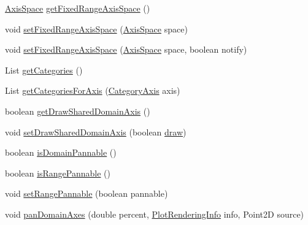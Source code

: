\begin{DoxyCompactItemize}
\item 
\mbox{\hyperlink{classorg_1_1jfree_1_1chart_1_1axis_1_1_axis_space}{Axis\+Space}} \mbox{\hyperlink{classorg_1_1jfree_1_1chart_1_1plot_1_1_category_plot_a436aced34ca58adf5d445e6a62f861c9}{get\+Fixed\+Range\+Axis\+Space}} ()
\item 
void \mbox{\hyperlink{classorg_1_1jfree_1_1chart_1_1plot_1_1_category_plot_a281491a8dbacd4f5a2e1cf156850d6a0}{set\+Fixed\+Range\+Axis\+Space}} (\mbox{\hyperlink{classorg_1_1jfree_1_1chart_1_1axis_1_1_axis_space}{Axis\+Space}} space)
\item 
void \mbox{\hyperlink{classorg_1_1jfree_1_1chart_1_1plot_1_1_category_plot_a2e0fb5c2ddc9f075eb43d0efff471044}{set\+Fixed\+Range\+Axis\+Space}} (\mbox{\hyperlink{classorg_1_1jfree_1_1chart_1_1axis_1_1_axis_space}{Axis\+Space}} space, boolean notify)
\item 
List \mbox{\hyperlink{classorg_1_1jfree_1_1chart_1_1plot_1_1_category_plot_aca7e5c323ac879cefd2816c7f3f3f994}{get\+Categories}} ()
\item 
List \mbox{\hyperlink{classorg_1_1jfree_1_1chart_1_1plot_1_1_category_plot_a879a45cd478b62daf45aa2d82a49546e}{get\+Categories\+For\+Axis}} (\mbox{\hyperlink{classorg_1_1jfree_1_1chart_1_1axis_1_1_category_axis}{Category\+Axis}} axis)
\item 
boolean \mbox{\hyperlink{classorg_1_1jfree_1_1chart_1_1plot_1_1_category_plot_a9e0c506ed8f06c4136707ed8bc7febf2}{get\+Draw\+Shared\+Domain\+Axis}} ()
\item 
void \mbox{\hyperlink{classorg_1_1jfree_1_1chart_1_1plot_1_1_category_plot_ac261da7da2048f2b53f78ef996dfc2c5}{set\+Draw\+Shared\+Domain\+Axis}} (boolean \mbox{\hyperlink{classorg_1_1jfree_1_1chart_1_1plot_1_1_category_plot_ac32fc9b28844db99ced138bd570596c3}{draw}})
\item 
boolean \mbox{\hyperlink{classorg_1_1jfree_1_1chart_1_1plot_1_1_category_plot_ac365d760808474f7b01fb0642a956f93}{is\+Domain\+Pannable}} ()
\item 
boolean \mbox{\hyperlink{classorg_1_1jfree_1_1chart_1_1plot_1_1_category_plot_ae919889b6b612a6f5df7f204a3356d19}{is\+Range\+Pannable}} ()
\item 
void \mbox{\hyperlink{classorg_1_1jfree_1_1chart_1_1plot_1_1_category_plot_ac8f35c81ce79745391ed6d160a1d8ddd}{set\+Range\+Pannable}} (boolean pannable)
\item 
void \mbox{\hyperlink{classorg_1_1jfree_1_1chart_1_1plot_1_1_category_plot_a62e996586fd48d02b2344940eae20f40}{pan\+Domain\+Axes}} (double percent, \mbox{\hyperlink{classorg_1_1jfree_1_1chart_1_1plot_1_1_plot_rendering_info}{Plot\+Rendering\+Info}} info, Point2D source)

\end{DoxyCompactItemize}
